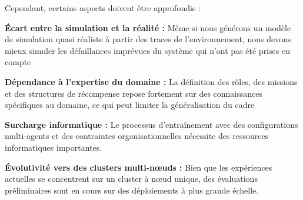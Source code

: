 Cependant, certains aspects doivent être approfondis :
\begin{enumerate*}[label=\textbf{\arabic*)}, itemjoin={;\quad }]
    \item \textbf{Écart entre la simulation et la réalité :} Même si nous générons un modèle de simulation quasi réaliste à partir des traces de l'environnement, nous devons mieux simuler les défaillances imprévues du système qui n'ont pas été prises en compte
    \item \textbf{Dépendance à l'expertise du domaine :} La définition des rôles, des missions et des structures de récompense repose fortement sur des connaissances spécifiques au domaine, ce qui peut limiter la généralisation du cadre
    \item \textbf{Surcharge informatique :} Le processus d'entraînement avec des configurations multi-agents et des contraintes organisationnelles nécessite des ressources informatiques importantes.
    \item \textbf{Évolutivité vers des clusters multi-nœuds :} Bien que les expériences actuelles se concentrent sur un cluster à nœud unique, des évaluations préliminaires sont en cours sur des déploiements à plus grande échelle.

\end{enumerate*}


